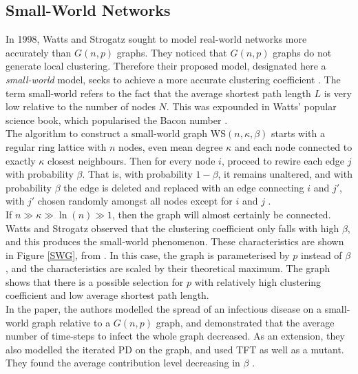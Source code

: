  \subsection{Small-World Networks}
In 1998, Watts and Strogatz sought to model real-world networks more accurately than $G(n,p)$ graphs. They noticed that $G(n,p)$ graphs do not generate local clustering. Therefore their proposed model, designated here a \emph{small-world} model, seeks to achieve a more accurate clustering coefficient \cite{RN58}. The term small-world refers to the fact that the average shortest path length $L$ is very low relative to the number of nodes $N$. This was expounded in Watts' popular science book,  which popularised the Bacon number \cite{RN57}.   \\

The algorithm to construct a small-world graph $\mathrm{WS}(n,\kappa,\beta)$ starts with a regular ring lattice with $n$ nodes, even mean degree $\kappa$ and each node connected to exactly $\kappa$ closest neighbours. Then for every node $i$, proceed to rewire each edge $j$ with probability $\beta$. That is, with probability $1-\beta$, it remains unaltered, and with probability $\beta$ the edge is deleted and replaced with an edge connecting $i$ and $j'$, with $j'$ chosen randomly amongst all nodes except for $i$ and $j$ \cite{RN58}. \\

If $n \gg \kappa \gg \ln(n) \gg 1 $, then the graph will almost certainly be connected. Watts and Strogatz observed that the clustering coefficient only falls with high $\beta$, and this produces the small-world phenomenon. These characteristics are shown in Figure \ref{SWG}, from \cite{RN93}. In this case, the graph is parameterised by $p$ instead of $\beta$, and the characteristics are scaled by their theoretical maximum. The graph shows that there is a possible selection for $p$ with relatively high clustering coefficient and low average shortest path length.  \\
\FloatBarrier
{}
\FloatBarrier
In the paper, the authors modelled the spread of an infectious disease on a small-world graph relative to a $G(n,p)$ graph, and demonstrated that the average number of time-steps to infect the whole graph decreased. As an extension, they also modelled the iterated PD on the graph, and used TFT as well as a mutant. They found the average contribution level decreasing in $\beta$ \cite{RN58}. \\


